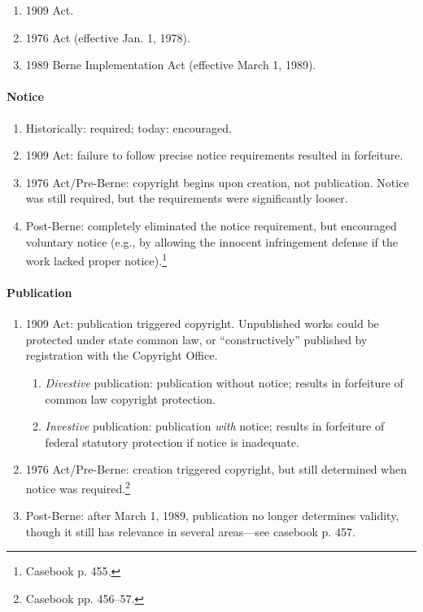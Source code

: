 \begin{enumerate}
    \item 1909 Act.
    \item 1976 Act (effective Jan. 1, 1978).
    \item 1989 Berne Implementation Act (effective March 1, 1989).
\end{enumerate}

\paragraph{Notice}

\begin{enumerate}
    \item Historically: required; today: encouraged.
    \item 1909 Act: failure to follow precise notice requirements resulted in 
    forfeiture.
    \item 1976 Act/Pre-Berne: copyright begins upon creation, not 
    publication. Notice was still required, but the requirements were 
    significantly looser.
    \item Post-Berne: completely eliminated the notice requirement, but 
    encouraged voluntary notice (e.g., by allowing the innocent infringement 
    defense if the work lacked proper notice).\footnote{Casebook p. 455.}
\end{enumerate}

\paragraph{Publication}

\begin{enumerate}
    \item 1909 Act: publication triggered copyright. Unpublished works could 
    be protected under state common law, or ``constructively'' published by 
    registration with the Copyright Office.
    \begin{enumerate}
        \item \emph{Divestive} publication: publication without notice; 
        results in forfeiture of common law copyright protection. 
        \item \emph{Investive} publication: publication \emph{with} 
        notice; results in forfeiture of federal statutory protection if 
        notice is inadequate.
    \end{enumerate}
    \item 1976 Act/Pre-Berne: creation triggered copyright, but still 
    determined when notice was required.\footnote{Casebook pp. 456--57.}
    \item Post-Berne: after March 1, 1989, publication no longer determines 
    validity, though it still has relevance in several areas---see casebook p. 
    457.
\end{enumerate}

